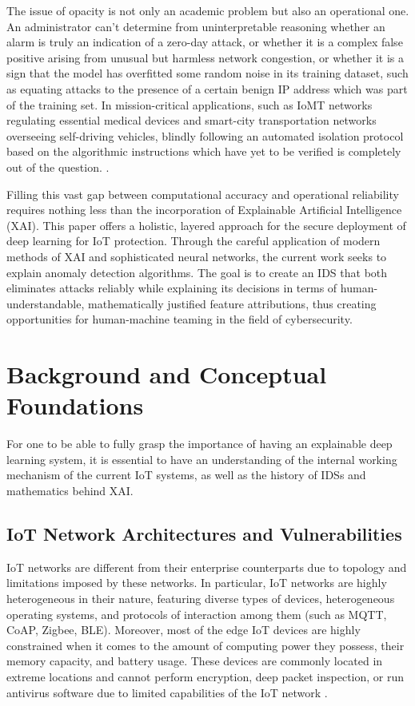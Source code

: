 \documentclass[12pt]{article}
\begin{document}
    The issue of opacity is not only an academic problem but also an operational one. An administrator can’t determine from uninterpretable reasoning whether an alarm is truly an indication of a zero-day attack, or whether it is a complex false positive arising from unusual but harmless network congestion, or whether it is a sign that the model has overfitted some random noise in its training dataset, such as equating attacks to the presence of a certain benign IP address which was part of the training set. In mission-critical applications, such as IoMT networks regulating essential medical devices and smart-city transportation networks overseeing self-driving vehicles, blindly following an automated isolation protocol based on the algorithmic instructions which have yet to be verified is completely out of the question. \cite{das2023trustworthy, zolanvari2021transparent, anthony2025designing}.

    Filling this vast gap between computational accuracy and operational reliability requires nothing less than the incorporation of Explainable Artificial Intelligence (XAI). This paper offers a holistic, layered approach for the secure deployment of deep learning for IoT protection. Through the careful application of modern methods of XAI and sophisticated neural networks, the current work seeks to explain anomaly detection algorithms. The goal is to create an IDS that both eliminates attacks reliably while explaining its decisions in terms of human-understandable, mathematically justified feature attributions, thus creating opportunities for human-machine teaming in the field of cybersecurity.

    \section{Background and Conceptual Foundations}
    For one to be able to fully grasp the importance of having an explainable deep learning system, it is essential to have an understanding of the internal working mechanism of the current IoT systems, as well as the history of IDSs and mathematics behind XAI.

    \subsection{IoT Network Architectures and Vulnerabilities}
    IoT networks are different from their enterprise counterparts due to topology and limitations imposed by these networks. In particular, IoT networks are highly heterogeneous in their nature, featuring diverse types of devices, heterogeneous operating systems, and protocols of interaction among them (such as MQTT, CoAP, Zigbee, BLE). Moreover, most of the edge IoT devices are highly constrained when it comes to the amount of computing power they possess, their memory capacity, and battery usage. These devices are commonly located in extreme locations and cannot perform encryption, deep packet inspection, or run antivirus software due to limited capabilities of the IoT network \cite{jes2024iot}.
    
\end{document}
